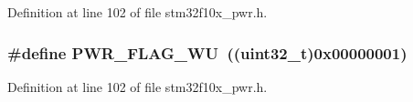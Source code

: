 Definition at line 102 of file stm32f10x\+\_\+pwr.\+h.

\subsubsection[{\texorpdfstring{P\+W\+R\+\_\+\+F\+L\+A\+G\+\_\+\+WU}{PWR_FLAG_WU}}]{\setlength{\rightskip}{0pt plus 5cm}\#define P\+W\+R\+\_\+\+F\+L\+A\+G\+\_\+\+WU~(({\bf uint32\+\_\+t})0x00000001)}\hypertarget{group___p_w_r___flag_ga2d06760a5769e729b06d41e37036d58e}{}\label{group___p_w_r___flag_ga2d06760a5769e729b06d41e37036d58e}


Definition at line 102 of file stm32f10x\+\_\+pwr.\+h.

